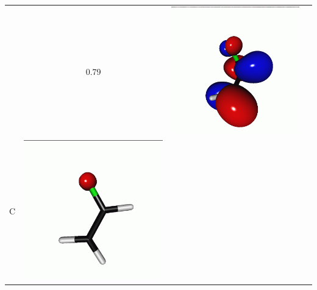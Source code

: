 \documentclass[journal=jctcce,manuscript=article]{achemso}
\begin{document}
\begin{table}[H]
\begin{tabular}{ c | c c c }
\begin{minipage}{0.2\textwidth}
     \end{minipage}
     & 0.79
     &  \begin{minipage}{0.2\textwidth}
         \centering
         \includegraphics[scale=0.10]{NTO/CH2CHF/CH2CHF_F_2p.png}
     \end{minipage}
     \\
             C &  
     \begin{minipage}{0.2\textwidth}
         \centering
         \includegraphics[scale=0.10]{NTO/CH2CHF/CH2CHF_F_3h.png}

\end{minipage}
\end{tabular}
\end{table}
\end{document}
